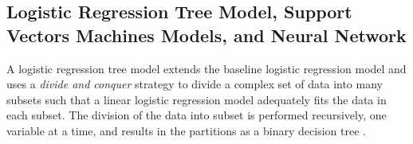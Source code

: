 \documentclass[12pt,english]{report}
\begin{document}

\subsection{Logistic Regression Tree Model, Support Vectors Machines Models, and Neural Network }
A logistic regression tree model extends the baseline logistic regression model and uses a \textit{divide and conquer} strategy to divide  a complex set of data into many subsets such that a linear logistic regression model adequately fits the data in each subset. The division of the data into subset is performed recursively, one variable at a time, and results in the partitions as a binary decision tree \citep{harrell2013regression_book}. 
\end{document}
